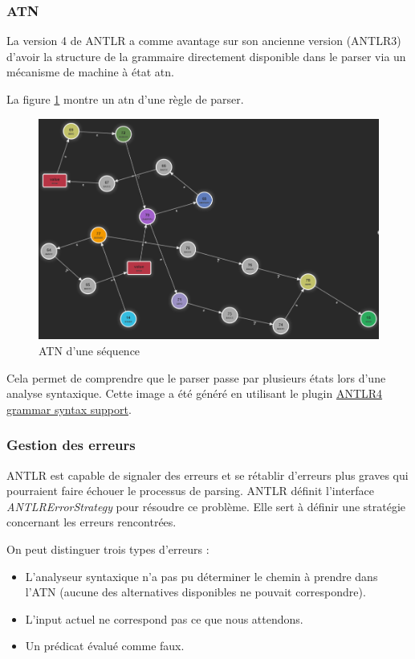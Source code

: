 \documentclass[
    iict, %
    il, %
]{heig-tb}
\begin{document}
\subsubsection{ATN}

La version 4 de ANTLR a comme avantage sur son ancienne version (ANTLR3) d'avoir la structure de la grammaire directement disponible dans le parser via
un mécanisme de machine à état \Gls{atn}.

La figure \ref{ATN d'une séquence} montre un atn d'une règle de parser.

\begin{figure}[!ht]
    \begin{center}
        \includegraphics[width=12cm]{assets/figures/seq_ATN.png}
    \end{center}
    \caption[ATN d'une séquence]{\label{ATN d'une séquence} ATN d'une séquence}
\end{figure}

Cela permet de comprendre que le parser passe par plusieurs états lors d'une analyse syntaxique.
Cette image a été généré en utilisant le plugin \href{https://marketplace.visualstudio.com/items?itemName=mike-lischke.vscode-antlr4}{ANTLR4 grammar syntax support}.

\subsubsection{Gestion des erreurs}

ANTLR est capable de signaler des erreurs et se rétablir d'erreurs plus graves qui pourraient faire échouer le processus de parsing.
ANTLR définit l'interface \emph{ANTLRErrorStrategy} pour résoudre ce problème.
Elle sert à définir une stratégie concernant les erreurs rencontrées.

On peut distinguer trois types d'erreurs \cite{ANTLRErrorStrategy} :
\begin{itemize}
    \item L'analyseur syntaxique n'a pas pu déterminer le chemin à prendre dans l'ATN (aucune des alternatives disponibles ne pouvait correspondre).
    \item L'input actuel ne correspond pas ce que nous attendons.
    \item Un prédicat évalué comme faux.
\end{itemize}
\end{document}
